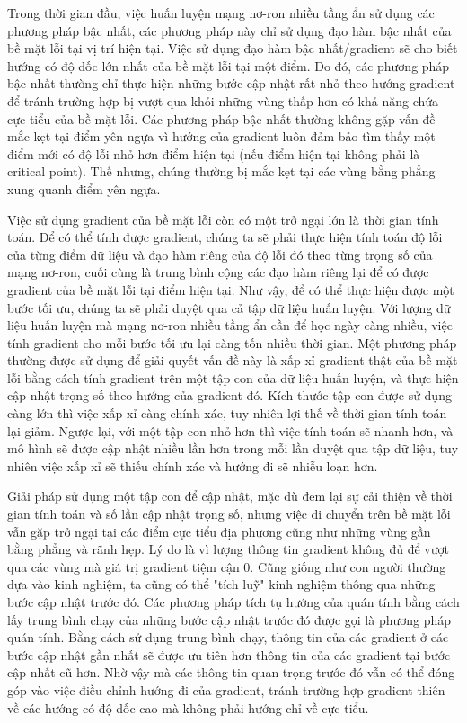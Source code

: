 Trong thời gian đầu, việc huấn luyện mạng nơ-ron nhiều tầng ẩn sử dụng các phương pháp bậc nhất, các phương pháp này chỉ sử dụng đạo hàm bậc nhất của bề mặt lỗi tại vị trí hiện tại. Việc sử dụng đạo hàm bậc nhất/gradient sẽ cho biết hướng có độ dốc lớn nhất của bề mặt lỗi tại một điểm. Do đó, các phương pháp bậc nhất thường chỉ thực hiện những bước cập nhật rất nhỏ theo hướng gradient để tránh trường hợp bị vượt qua khỏi những vùng thấp hơn có khả năng chứa cực tiểu của bề mặt lỗi. Các phương pháp bậc nhất thường không gặp vấn đề mắc kẹt tại điểm yên ngựa vì hướng của gradient luôn đảm bảo tìm thấy một điểm mới có độ lỗi nhỏ hơn điểm hiện tại (nếu điểm hiện tại không phải là critical point). Thế nhưng, chúng thường bị mắc kẹt tại các vùng bằng phẳng xung quanh điểm yên ngựa.

Việc sử dụng gradient của bề mặt lỗi còn có một trở ngại lớn là thời gian tính toán. Để có thể tính được gradient, chúng ta sẽ phải thực hiện tính toán độ lỗi của từng điểm dữ liệu và đạo hàm riêng của độ lỗi đó theo từng trọng số của mạng nơ-ron, cuối cùng là trung bình cộng các đạo hàm riêng lại để có được gradient của bề mặt lỗi tại điểm hiện tại. Như vậy, để có thể thực hiện được một bước tối ưu, chúng ta sẽ phải duyệt qua cả tập dữ liệu huấn luyện. Với lượng dữ liệu huấn luyện mà mạng nơ-ron nhiều tầng ẩn cần để học ngày càng nhiều, việc tính gradient cho mỗi bước tối ưu lại càng tốn nhiều thời gian. Một phương pháp thường được sử dụng để giải quyết vấn đề này là xấp xỉ gradient thật của bề mặt lỗi bằng cách tính gradient trên một tập con của dữ liệu huấn luyện, và thực hiện cập nhật trọng số theo hướng của gradient đó. Kích thước tập con được sử dụng càng lớn thì việc xấp xỉ càng chính xác, tuy nhiên lợi thế về thời gian tính toán lại giảm. Ngược lại, với một tập con nhỏ hơn thì việc tính toán sẽ nhanh hơn, và mô hình sẽ được cập nhật nhiều lần hơn trong mỗi lần duyệt qua tập dữ liệu, tuy nhiên việc xấp xỉ sẽ thiếu chính xác và hướng đi sẽ nhiễu loạn hơn.

Giải pháp sử dụng một tập con để cập nhật, mặc dù đem lại sự cải thiện về thời gian tính toán và số lần cập nhật trọng số, nhưng việc di chuyển trên bề mặt lỗi vẫn gặp trở ngại tại các điểm cực tiểu địa phương cũng như những vùng gần bằng phẳng và rãnh hẹp. Lý do là vì lượng thông tin gradient không đủ để vượt qua các vùng mà giá trị gradient tiệm cận 0. Cũng giống như con người thường dựa vào kinh nghiệm, ta cũng có thể "tích luỹ" kinh nghiệm thông qua những bước cập nhật trước đó. Các phương pháp tích tụ hướng của quán tính bằng cách lấy trung bình chạy của những bước cập nhật trước đó được gọi là phương pháp quán tính. Bằng cách sử dụng trung bình chạy, thông tin của các gradient ở các bước cập nhật gần nhất sẽ được ưu tiên hơn thông tin của các gradient tại bước cập nhất cũ hơn. Nhờ vậy mà các thông tin quan trọng trước đó vẫn có thể đóng góp vào việc điều chỉnh hướng đi của gradient, tránh trường hợp gradient thiên về các hướng có độ dốc cao mà không phải hướng chỉ về cực tiểu.

